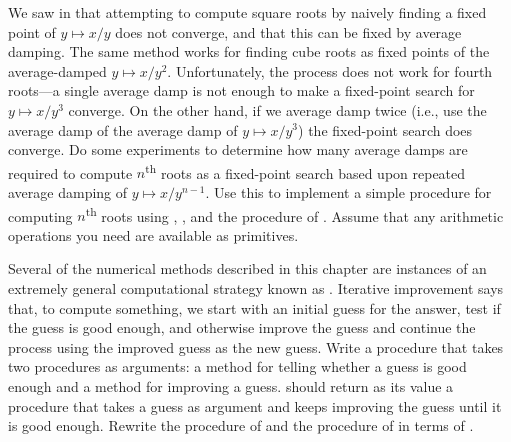 \begin{exercise}
	\label{Exercise 1.45}
	We saw in  that attempting to compute square roots by naively finding a fixed point of \( y \mapsto x / y \) does not converge, and that this can be fixed by average damping.
	The same method works for finding cube roots as fixed points of the average-damped \( y \mapsto x / y^2 \).
	Unfortunately, the process does not work for fourth roots---a single average damp is not enough to make a fixed-point search for \( y \mapsto x / y^3 \) converge.
	On the other hand, if we average damp twice (i.e., use the average damp of the average damp of \( y \mapsto x / y^3 \)) the fixed-point search does converge.
	Do some experiments to determine how many average damps are required to compute \( n \)\textsuperscript{th} roots as a fixed-point search based upon repeated average damping of \( y \mapsto x / y^{n - 1} \).
	Use this to implement a simple procedure for computing \( n \)\textsuperscript{th} roots using , , and the  procedure of .
	Assume that any arithmetic operations you need are available as primitives.
\end{exercise}



\begin{exercise}
	\label{Exercise 1.46}
	Several of the numerical methods described in this chapter are instances of an extremely general computational strategy known as .
	Iterative improvement says that, to compute something, we start with an initial guess for the answer, test if the guess is good enough, and otherwise improve the guess and continue the process using the improved guess as the new guess.
	Write a procedure  that takes two procedures as arguments:
	a method for telling whether a guess is good enough and a method for improving a guess.
	 should return as its value a procedure that takes a guess as argument and keeps improving the guess until it is good enough.
	Rewrite the  procedure of  and the  procedure of  in terms of .
\end{exercise}
